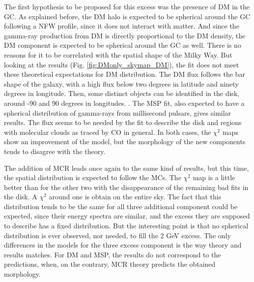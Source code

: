 The first hypothesis to be proposed for this excess was the presence of DM in the GC. As explained before, the DM halo is expected to be spherical around the GC following a NFW profile, since it does not interact with matter. And since the gamma-ray production from DM is directly proportional to the DM density, the DM component is expected to be spherical around the GC as well. There is no reasons for it to be correlated with the spatial shape of the Milky Way. But looking at the results (Fig. \ref{fig:DMonly_skymap_DM}), the fit does not meet these theoretical expectations for DM distribution. The DM flux follows the bar shape of the galaxy, with a high flux below two degrees in latitude and ninety degrees in longitude. Then, some distinct objects can be identified in the disk, around -90 and 90 degrees in longitudes. .
The MSP fit, also expected to have a spherical distribution of gamma-rays from millisecond pulsars, gives similar results. The flux seems to be needed by the fit to describe the disk and regions with molecular clouds as traced by CO in general.
In both cases, the $\chi^2$ maps show an improvement of the model, but the morphology of the new components tends to disagree with the theory.




The addition of MCR leads once again to the same kind of results, but this time, the spatial distribution is expected to follow the MCs. The $\chi^2$ map is a little better than for the other two with the disappearance of the remaining bad fits in the disk. A $\chi^2$ around one is obtain on the entire sky. 
The fact that this distribution tends to be the same for all three additional component could be expected, since their energy spectra are similar, and the excess they are supposed to describe has a fixed distribution. But the interesting point is that no spherical distribution is ever observed, nor needed, to fill the 2 GeV excess. 
The only differences in the models for the three excess component is the way theory and results matches. For DM and MSP, the results do not correspond to the predictions, when, on the contrary, MCR theory predicts the obtained morphology.


